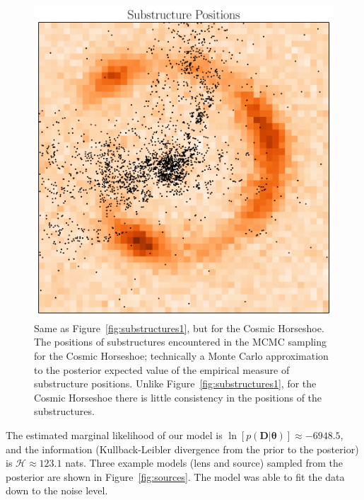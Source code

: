 \documentclass[useAMS,usenatbib]{mn2e}
\newcommand{\revisions}{\color{blue}}
\begin{document}
\begin{figure}
\begin{center}
\includegraphics[scale=0.4]{substructures3.pdf}
\caption{{\revisions Same as Figure~\ref{fig:substructures1}, but for the Cosmic Horseshoe.} The positions of substructures encountered in the MCMC sampling
for the Cosmic Horseshoe; technically a Monte Carlo approximation to the
posterior expected value of the empirical measure of substructure
positions. Unlike Figure~\ref{fig:substructures1}, for the Cosmic Horseshoe
there is little consistency in the positions of the substructures.
\label{fig:substructures3}}
\end{center}
\end{figure}

The estimated marginal likelihood of our model
is {\revisions
$\ln\left[p(\boldsymbol{D} | \boldsymbol{\theta})\right] \approx -6948.5$}, and
the information (Kullback-Leibler divergence from the prior to the posterior)
is {\revisions $\mathcal{H} \approx 123.1$} nats. 
Three example models (lens and source) sampled from the posterior are shown
in Figure~\ref{fig:sources}. {\revisions
The model was able to fit the data down to the noise level.
}
\end{document}
